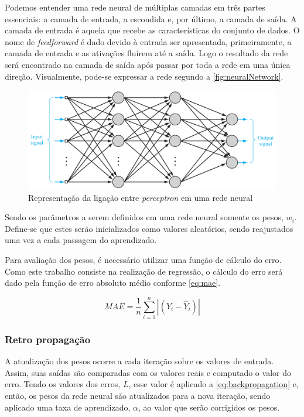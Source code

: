 \documentclass[
    12pt,
    oneside,
    a4paper,
    english,
    brazil
]{abntex2}
\begin{document}
Podemos  entender  uma  rede  neural   de  múltiplas  camadas  em  três  partes
essenciais: a camada de entrada, a escondida  e, por último, a camada de saída.
A  camada de  entrada é  aquela que  recebe as  características do  conjunto de
dados. O nome de \textit{feedforward} é  dado devido à entrada ser apresentada,
primeiramente, a camada de  entrada e as ativações fluírem até  a saída. Logo o
resultado da  rede será encontrado  na camada de saída  após passar por  toda a
rede em  uma única  direção. Visualmente,  pode-se expressar  a rede  segundo a
\autoref{fig:neuralNetwork}.

\begin{figure}[ht]
    \centering
    \caption{Representação da ligação entre \textit{perceptron} em uma rede
    neural}\label{fig:neuralNetwork}
    \includegraphics[width=.5\linewidth]{images/neuralNetwork.png}
\end{figure}

Sendo os  parâmetros a  serem definidos  em uma rede  neural somente  os pesos,
$w_i$. Define-se que  estes serão inicializados como  valores aleatórios, sendo
reajustados uma vez a cada passagem do aprendizado.

Para avaliação dos pesos, é necessário  utilizar uma função de cálculo do erro.
Como este trabalho consiste na realização  de regressão, o cálculo do erro será
dado pela função de erro absoluto médio conforme \autoref{eq:mae}.

\begin{equation}\label{eq:mae}
    MAE = \frac{1}{n}\sum_{i=1}^{n}{|(Y_i - \hat{Y}_i)|}
\end{equation}

\subsubsection{Retro propagação}

A atualização  dos pesos ocorre  a cada iteração  sobre os valores  de entrada.
Assim,  suas  saídas  são  comparadas  com  os  valores  reais  e  computado  o
valor  do erro.  Tendo os  valores  dos erros,  $L$,  esse valor  é aplicado  a
\autoref{eq:backpropagation} e, então, os pesos  da rede neural são atualizados
para a  nova iteração,  sendo aplicado  uma taxa  de aprendizado,  $\alpha$, ao
valor que serão corrigidos os pesos.
\end{document}
